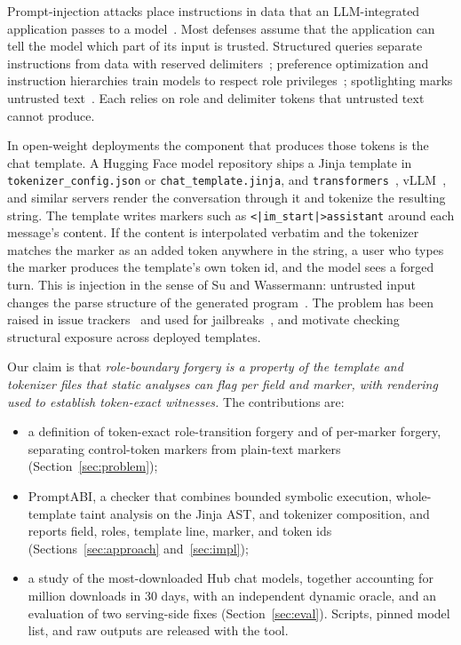 \documentclass[10pt,conference]{IEEEtran}
\newcommand{\tool}{PromptABI\xspace}
\begin{document}
Prompt-injection attacks place instructions in data that an LLM-integrated
application passes to a
model~\cite{perez2022ignore,greshake2023indirect,liu2024formalizing}. Most
defenses assume that the application can tell the model which part of its input
is trusted. Structured queries separate instructions from data with reserved
delimiters~\cite{chen2025struq}; preference optimization and instruction
hierarchies train models to respect role
privileges~\cite{chen2024secalign,wallace2024hierarchy}; spotlighting marks
untrusted text~\cite{hines2024spotlighting}. Each relies on role and delimiter
tokens that untrusted text cannot produce.

In open-weight deployments the component that produces those tokens is the
chat template. A Hugging Face model repository ships a Jinja template in
\texttt{tokenizer\_config.json} or \texttt{chat\_template.jinja}, and
\texttt{transformers}~\cite{wolf2020transformers}, vLLM~\cite{kwon2023vllm},
and similar servers render the conversation through it and tokenize the
resulting string. The template writes markers such as
\texttt{<|im\_start|>assistant} around each message's content. If the content
is interpolated verbatim and the tokenizer matches the marker as an added token
anywhere in the string, a user who types the marker produces the template's own
token id, and the model sees a forged turn. This is injection in the sense of
Su and Wassermann: untrusted input changes the parse structure of the generated
program~\cite{su2006essence}. The problem has been raised in issue
trackers~\cite{hf2024issue29279} and used for
jailbreaks~\cite{jiang2025chatbug,zhou2024virtual}, and motivate checking structural exposure across deployed templates.

Our claim is that \emph{role-boundary forgery is a property of the template and
tokenizer files that static analyses can flag per field and marker,
with rendering used to establish token-exact witnesses.} The contributions are:
\begin{itemize}
\item a definition of token-exact role-transition forgery and of per-marker
forgery, separating control-token markers from plain-text markers
(Section~\ref{sec:problem});
\item \tool, a checker that combines bounded symbolic execution,
whole-template taint analysis on the Jinja AST, and tokenizer composition, and
reports field, roles, template line, marker, and token ids
(Sections~\ref{sec:approach} and~\ref{sec:impl});
\item a study of the \NModels{} most-downloaded Hub chat models, together
accounting for \DownloadsMillions{} million downloads in 30 days, with an
independent dynamic oracle, and an evaluation of two serving-side fixes
(Section~\ref{sec:eval}). Scripts, pinned model list, and raw outputs are
released with the tool.
\end{itemize}
\end{document}
